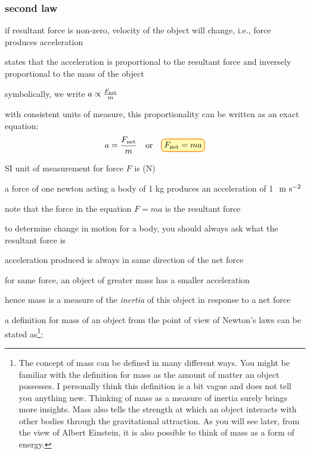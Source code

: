 \subsubsection{second law}

if resultant force is non-zero, velocity of the object will change, i.e., force produces acceleration


\begin{ilight}
	 states that the acceleration is proportional to the resultant force and inversely proportional to the mass of the object
\end{ilight}

\cmt symbolically, we write $a \propto \frac{F_\text{net}}{m}$

with consistent units of measure, this proportionality can be written as an exact equation:
\begin{equation}
a=\frac{\fnet}{m} \quad \text{or} \quad \boxed{\fnet=ma}
\end{equation}

\cmt SI unit of measurement for force $F$ is  (N)

a force of one newton acting a body of 1 kg produces an acceleration of 1 $\text{ m s$^{-2}$}$

\cmt note that the force in the equation $F=ma$ is the resultant force

to determine change in motion for a body, you should always ask what the resultant force is

\cmt acceleration produced is always in same direction of the net force

\cmt for same force, an object of greater mass has a smaller acceleration

hence mass is a measure of the \emph{inertia} of this object in response to a net force

a definition for mass of an object from the point of view of Newton's laws can be stated as\footnote{The concept of mass can be defined in many different ways. You might be familiar with the definition for mass as the amount of matter an object possesses. I personally think this definition is a bit vague and does not tell you anything new. Thinking of mass as a measure of inertia surely brings more insights. Mass also tells the strength at which an object interacts with other bodies through the gravitational attraction. As you will see later, from the view of Albert Einstein, it is also possible to think of mass as a form of energy.}:

